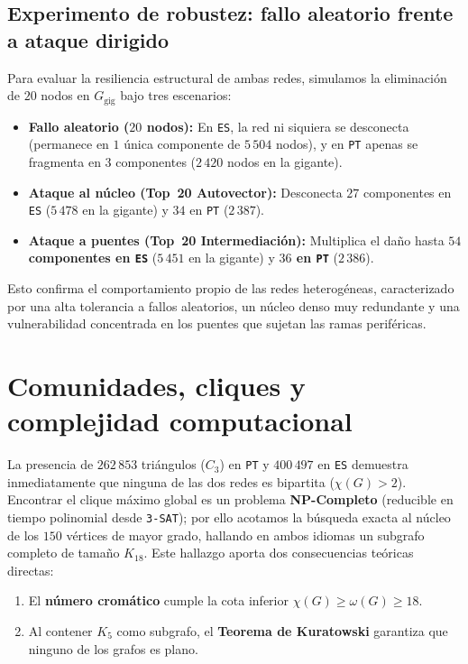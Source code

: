 \documentclass[11pt,a4paper]{article}
\begin{document}
\subsection{Experimento de robustez: fallo aleatorio frente a ataque dirigido}
Para evaluar la resiliencia estructural de ambas redes, simulamos la eliminación de $20$ nodos en $G_{\text{gig}}$ bajo tres escenarios:
\begin{itemize}[leftmargin=*, itemsep=2pt]
  \item \textbf{Fallo aleatorio ($20$ nodos):} En \texttt{ES}, la red ni siquiera se desconecta (permanece en $1$ única componente de $5\,504$ nodos), y en \texttt{PT} apenas se fragmenta en $3$ componentes ($2\,420$ nodos en la gigante).
  \item \textbf{Ataque al núcleo (Top~20 Autovector):} Desconecta $27$ componentes en \texttt{ES} ($5\,478$ en la gigante) y $34$ en \texttt{PT} ($2\,387$).
  \item \textbf{Ataque a puentes (Top~20 Intermediación):} Multiplica el daño hasta \textbf{$54$ componentes en \texttt{ES}} ($5\,451$ en la gigante) y \textbf{$36$ en \texttt{PT}} ($2\,386$).
\end{itemize}
Esto confirma el comportamiento propio de las redes heterogéneas, caracterizado por una alta tolerancia a fallos aleatorios, un núcleo denso muy redundante y una vulnerabilidad concentrada en los puentes que sujetan las ramas periféricas.

\section{Comunidades, cliques y complejidad computacional}

La presencia de $262\,853$ triángulos ($C_3$) en \texttt{PT} y $400\,497$ en \texttt{ES} demuestra inmediatamente que ninguna de las dos redes es bipartita ($\chi(G) > 2$). Encontrar el clique máximo global es un problema \textbf{NP-Completo} (reducible en tiempo polinomial desde \texttt{3-SAT}); por ello acotamos la búsqueda exacta al núcleo de los $150$ vértices de mayor grado, hallando en ambos idiomas un subgrafo completo de tamaño \textbf{$K_{18}$}. Este hallazgo aporta dos consecuencias teóricas directas:
\begin{enumerate}[leftmargin=*, itemsep=2pt]
  \item El \textbf{número cromático} cumple la cota inferior $\chi(G) \ge \omega(G) \ge 18$.
  \item Al contener $K_5$ como subgrafo, el \textbf{Teorema de Kuratowski} garantiza que ninguno de los grafos es plano.
\end{enumerate}
\end{document}
